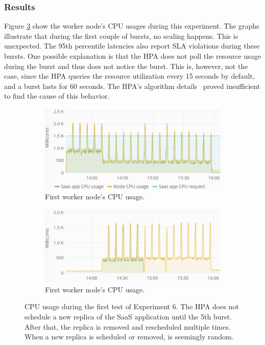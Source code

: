 \subsubsection{Results}
Figure \ref{fig:cpu-saas-hpa-bursty} show the worker node's CPU usages during this experiment. The graphs illustrate that during the first couple of bursts, no scaling happens. This is unexpected. The 95th percentile latencies also report SLA violations during these bursts. One possible explanation is that the HPA does not poll the resource usage during the burst and thus does not notice the burst. This is, however, not the case, since the HPA queries the resource utilization every 15 seconds by default, and a burst lasts for 60 seconds. The HPA's algorithm details~\citep{hpa-algorithm-details} proved insufficient to find the cause of this behavior.\\


\begin{figure}
\centering
\begin{subfigure}[b]{\columnwidth}
\centering
\includegraphics[width=0.75\columnwidth]{Images/Experiments/CPU/Grafana/cpu-saas-hpa-bursty-2-1.PNG}
\caption{First worker node's CPU usage.}
\label{fig:cpu-saas-hpa-bursty-2-1}
\end{subfigure}
\hfill
\begin{subfigure}[b]{\columnwidth}
\centering
\includegraphics[width=0.75\columnwidth]{Images/Experiments/CPU/Grafana/cpu-saas-hpa-bursty-2-2.PNG}
\caption{First worker node's CPU usage.}
\label{fig:cpu-saas-hpa-bursty-2-2}
\end{subfigure}
\hfill
\caption{CPU usage during the first test of Experiment 6. The HPA does not schedule a new replica of the SaaS application until the 5th burst. After that, the replica is removed and rescheduled multiple times. When a new replica is scheduled or removed, is seemingly random. }
\label{fig:cpu-saas-hpa-bursty}
\end{figure}

